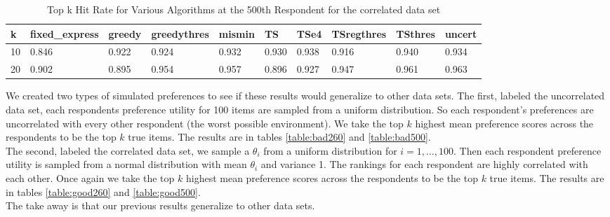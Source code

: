 \documentclass[nonblindrev]{informs3}
\begin{document}
\begin{table}
\begin{center}
\begin{tabular}{llllllllll}
\hline   k &  fixed\_express &  greedy &  greedythres &  mismin &    TS &  TSe4 &  TSregthres &  TSthres &  uncert \\\hline    10 & 0.846&0.922&0.924&0.932 & 	0.930&0.938 &   0.916&0.940 &   0.934 \\  20 & 0.902&0.895&0.954& 0.957& 0.896&0.927 & 0.947&0.961 & 0.963 
\end{tabular}
\end{center}
\caption{Top k Hit Rate for Various Algorithms at the 500th Respondent for the correlated data set}
\label{table:nice500}
\end{table}
We created two types of simulated preferences to see if these results would generalize to other data sets. The first, labeled the uncorrelated data set, each respondents preference utility for 100 items are sampled from a uniform distribution. So each respondent's preferences are uncorrelated with every other respondent (the worst possible environment). We take the top $k$ highest mean preference scores across the respondents to be the top $k$ true items. The results are in tables \ref{table:bad260} and \ref{table:bad500}.\\
The second, labeled the correlated data set, we sample a $\theta_i$ from a uniform distribution for $i=1,\ldots,100$. Then each respondent preference utility is sampled from a normal distribution with mean $\theta_i$ and variance 1. The rankings for each respondent are highly correlated with each other. Once again we take the top $k$ highest mean preference scores across the respondents to be the top $k$ true items. The results are in tables \ref{table:good260} and \ref{table:good500}.\\ The take away is that our previous results generalize to other data sets.
\end{document}
